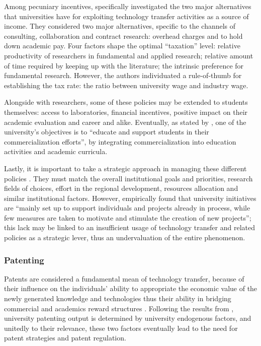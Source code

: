 Among pecuniary incentives, \citet{Beath2000} specifically investigated the two major alternatives that universities have for exploiting technology transfer activities as a source of income. They considered two major alternatives, specific to the channels of consulting, collaboration and contract research: overhead charges and to hold down academic pay. Four factors shape the optimal \enquote{taxation} level: relative productivity of researchers in fundamental and applied research; relative amount of time required by keeping up with the literature; the intrinsic preference for fundamental research. However, the authors individuated a rule-of-thumb for establishing the tax rate: the ratio between university wage and industry wage.

Alongside with researchers, some of these policies may be extended to students themselves: access to laboratories, financial incentives, positive impact on their academic evaluation and career and alike. Eventually, as stated by \citet{Rasmussen2006}, one of the university's objectives is to \enquote{educate and support students in their commercialization efforts}, by integrating commercialization into education activities and academic curricula. 

Lastly, it is important to take a strategic approach in managing these different policies \citep{Siegel2007}. They must match the overall institutional goals and priorities, research fields of choices, effort in the regional development, resources allocation and similar institutional factors. However, \citet{Rasmussen2006} empirically found that university initiatives are \enquote{mainly set up to support individuals and projects already in process, while few measures are taken to motivate and stimulate the creation of new projects}; this lack may be linked to an insufficient usage of technology transfer and related policies as a strategic lever, thus an undervaluation of the entire phenomenon.

\subsubsection{Patenting}

Patents are considered a fundamental mean of technology transfer, because of their influence on the individuals' ability to appropriate the economic value of the newly generated knowledge and technologies \citep{Bercovitz2006} thus their ability in bridging commercial and academics reward structures \citep{OwenSmith2001}. Following the results from \citet{Tijssen2006}, university patenting output is determined by university endogenous factors, and unitedly to their relevance, these two factors eventually lead to the need for patent strategies \citep{Siegel2007} and patent regulation.

